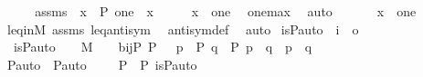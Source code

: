 \begin{isabellebody}
%
\isadelimproof
%
\endisadelimproof
%
\isatagproof
{}\isamarkupfalse%
{\isacharminus}{\kern0pt}\ \isanewline
\ \ \isamarkupfalse%
\ assms\ {\isacharcolon}{\kern0pt}\ {\isachardoublequoteopen}x\ {\isasymin}\ P{\isachardoublequoteclose}\ {\isachardoublequoteopen}one\ {\isasympreceq}\ x{\isachardoublequoteclose}\isanewline
\ \ \isamarkupfalse%
\ \isamarkupfalse%
\ {\isachardoublequoteopen}x\ {\isasympreceq}\ one{\isachardoublequoteclose}\ \isamarkupfalse%
\ one{\isacharunderscore}{\kern0pt}max\ \isamarkupfalse%
\ auto\ \isanewline
\ \ \isamarkupfalse%
\ \isamarkupfalse%
\ {\isachardoublequoteopen}x\ {\isacharequal}{\kern0pt}\ one{\isachardoublequoteclose}\ \isamarkupfalse%
\ leq{\isacharunderscore}{\kern0pt}in{\isacharunderscore}{\kern0pt}M\ assms\ leq{\isacharunderscore}{\kern0pt}antisym\ \isamarkupfalse%
\ antisym{\isacharunderscore}{\kern0pt}def\ \isamarkupfalse%
\ auto\isanewline
{}\isamarkupfalse%
%
\endisatagproof
{\isafoldproof}%
%
\isadelimproof
\isanewline
%
\endisadelimproof
\isanewline
{}\isamarkupfalse%
\ is{\isacharunderscore}{\kern0pt}P{\isacharunderscore}{\kern0pt}auto\ {\isacharcolon}{\kern0pt}{\isacharcolon}{\kern0pt}\ {\isachardoublequoteopen}i\ {\isasymRightarrow}\ o{\isachardoublequoteclose}\ \isanewline
\ \ {\isachardoublequoteopen}is{\isacharunderscore}{\kern0pt}P{\isacharunderscore}{\kern0pt}auto{\isacharparenleft}{\kern0pt}{\isasympi}{\isacharparenright}{\kern0pt}\ {\isasymequiv}\ {\isasympi}\ {\isasymin}\ M\ {\isasymand}\ {\isasympi}\ {\isasymin}\ bij{\isacharparenleft}{\kern0pt}P{\isacharcomma}{\kern0pt}\ P{\isacharparenright}{\kern0pt}\ {\isasymand}\ {\isacharparenleft}{\kern0pt}{\isasymforall}\ p\ {\isasymin}\ P{\isachardot}{\kern0pt}\ {\isasymforall}q\ {\isasymin}\ P{\isachardot}{\kern0pt}\ p\ {\isasympreceq}\ q\ {\isasymlongleftrightarrow}\ {\isasympi}{\isacharbackquote}{\kern0pt}p\ {\isasympreceq}\ {\isasympi}{\isacharbackquote}{\kern0pt}q{\isacharparenright}{\kern0pt}{\isachardoublequoteclose}\ \ \isanewline
\isanewline
{}\isamarkupfalse%
\ P{\isacharunderscore}{\kern0pt}auto\ \ {\isachardoublequoteopen}P{\isacharunderscore}{\kern0pt}auto\ {\isasymequiv}\ {\isacharbraceleft}{\kern0pt}\ {\isasympi}\ {\isasymin}\ P\ {\isasymrightarrow}\ P{\isachardot}{\kern0pt}\ is{\isacharunderscore}{\kern0pt}P{\isacharunderscore}{\kern0pt}auto{\isacharparenleft}{\kern0pt}{\isasympi}{\isacharparenright}{\kern0pt}\ {\isacharbraceright}{\kern0pt}{\isachardoublequoteclose}\ \isanewline

\end{isabellebody}
